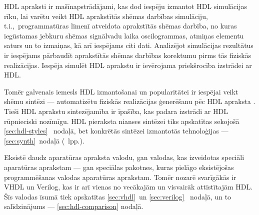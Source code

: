 HDL apraksti ir mašīn\-apstrādājami, kas dod iespēju izmantot
HDL simulācijas rīku, lai varētu veikt HDL aprakstītās shēmas 
darbības simulāciju, t.i.,~programmatūras līmenī 
atveidota aprakstītās shēmas darbība, no kuras iegūstamas jebkuru
shēmas signālvadu laika oscilogrammas, atmiņas elementu saturs un to izmaiņas,
kā arī iespējams citi dati. Analizējot simulācijas rezultātus ir 
iespējams pārbaudīt aprakstītās shēmas darbības korektumu pirms
tās fiziskās realizācijas. Iespēja simulēt HDL aprakstu ir ievērojama
priekšrocība izstrādei ar HDL.

Tomēr galvenais iemesls HDL izmantošanai un popularitātei ir iespējai veikt 
shēmu sintēzi --- automatizētu fiziskās realizācijas ģenerēšanu pēc HDL apraksta
\cite{HDL}\cite{Perry-VHDL}\cite{Vahid-RTL}. Tieši HDL aprakstu sintezējamība ir
īpašība, kas padara izstrādi ar HDL rūpnieciski nozīmīgu.
HDL pieraksta nianses sintēzei tiks apskatītas sekojošā \ref{sec:hdl-styles}~%
nodaļā, bet konkrētās sintēzei izmantotās tehnoloģijas --- 
\ref{sec:synth}~nodaļā (\pageref{sec:synth}~lpp.).

Eksistē daudz aparatūras apraksta valodu, gan valodas, kas izveidotas
speciāli aparatūras aprakstam --- gan speciālas pakotnes, kuras pielāgo
eksistējošas programmēšanas valodas aparatūras aprakstam.
Tomēr nozarē svarīgākās ir VHDL un Verilog, kas ir arī
vienas no vecākajām un visvairāk attīstītajām HDL.
Šīs valodas īsumā tiek apskatītas \ref{sec:vhdl}~un \ref{sec:verilog}~%
nodaļā, un to salīdzinājums --- \ref{sec:hdl-comparison} nodaļā.

 \clearpage %


